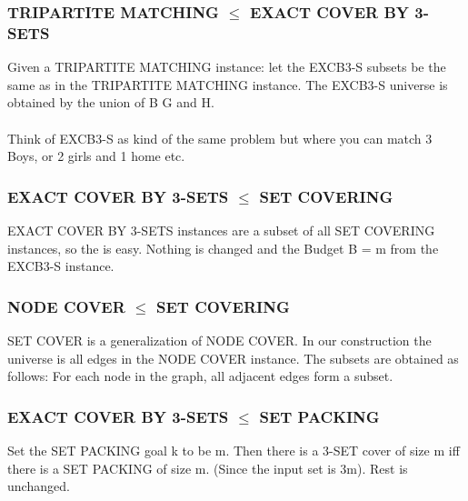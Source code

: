 \subsubsection{TRIPARTITE MATCHING $\le$ EXACT COVER BY 3-SETS}
Given a TRIPARTITE MATCHING instance: let the EXCB3-S subsets be the same as in the TRIPARTITE MATCHING instance. The EXCB3-S universe is obtained by the union of B G and H.\\\\
Think of EXCB3-S as kind of the same problem but where you can match 3 Boys, or 2 girls and 1 home etc. 
\subsubsection{EXACT COVER BY 3-SETS $\le$ SET COVERING}
EXACT COVER BY 3-SETS instances are a subset of all SET COVERING instances, so the is easy. Nothing is changed and the Budget B = m from the EXCB3-S instance.

\subsubsection{NODE COVER $\le$ 
SET COVERING}
SET COVER is a generalization of NODE COVER. In our construction the universe is all edges in the NODE COVER instance. The subsets are obtained as follows: For each node in the graph, all adjacent edges form a subset.
\subsubsection{EXACT COVER BY 3-SETS $\le$
SET PACKING}
Set the SET PACKING goal k to be m. Then there is a 3-SET cover of size m iff there is a SET PACKING of size m. (Since the input set is 3m). Rest is unchanged.  
\newpage

